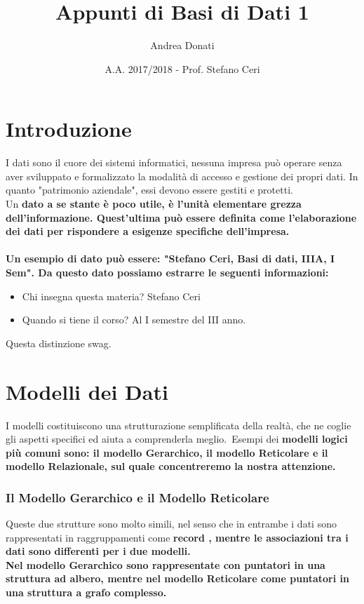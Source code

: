 \documentclass[11pt]{article} %
\title{Appunti di Basi di Dati 1}
\author{Andrea Donati}
\date{A.A. 2017/2018 - Prof. Stefano Ceri} %
\begin{document}
\maketitle

\newpage
\tableofcontents
\newpage

\section{Introduzione}

I dati sono il cuore dei sistemi informatici, nessuna impresa può operare senza aver sviluppato e formalizzato la modalità di accesso e gestione dei propri dati. In quanto "patrimonio aziendale", essi devono essere gestiti e protetti.\\
Un \bf dato \rm a se stante è poco utile, è l'unità elementare grezza dell'informazione. Quest'ultima può essere definita come l'\bf elaborazione \rm dei dati per rispondere a esigenze specifiche dell'impresa. \\
\\
Un esempio di \bf dato \rm può essere: "Stefano Ceri, Basi di dati, IIIA, I Sem". Da questo dato possiamo estrarre le seguenti informazioni:\\
\begin{itemize}
\item Chi insegna questa materia? Stefano Ceri
\item Quando si tiene il corso? Al I semestre del III anno.
\end{itemize}

\noindent Questa distinzione swag.

\section{Modelli dei Dati}

I modelli costituiscono una strutturazione semplificata della realtà, che ne coglie gli aspetti specifici ed aiuta a comprenderla meglio.\ Esempi dei \bf modelli logici \rm più comuni sono: il modello Gerarchico, il modello Reticolare e il modello Relazionale, sul quale concentreremo la nostra attenzione.

\subsubsection{Il Modello Gerarchico e il Modello Reticolare}
Queste due strutture sono molto simili, nel senso che in entrambe i dati sono rappresentati in raggruppamenti come \bf record \rm, mentre le associazioni tra i dati sono differenti per i due modelli.\\
Nel modello \bf Gerarchico \rm sono rappresentate con \bf puntatori \rm in una struttura ad albero, mentre nel modello \bf Reticolare \rm come \bf puntatori \rm in una struttura a grafo complesso.
\end{document}
